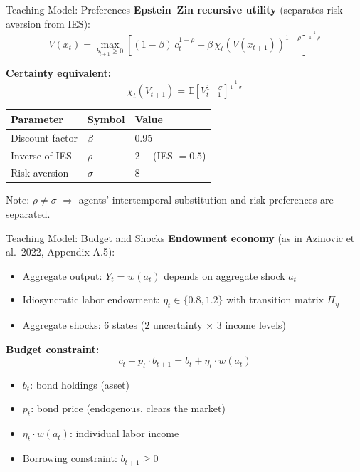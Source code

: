 \documentclass[aspectratio=169,11pt]{beamer}
\newcommand{\emphc}[1]{\textcolor{harvardcrimson}{#1}}
\newcommand{\E}[1]{\mathbb{E}\!\left[#1\right]}
\begin{document}
\begin{frame}{Teaching Model: Preferences}
\textbf{Epstein--Zin recursive utility} (separates risk aversion from IES):
\[
\boxed{V(x_t) = \max_{b_{t+1} \geq 0} \left[(1-\beta)\, c_t^{1-\rho} + \beta\, \chi_t\!\left(V(x_{t+1})\right)^{1-\rho}\right]^{\frac{1}{1-\rho}}}
\]

\vspace{0.3em}
\textbf{Certainty equivalent:}
\[
\chi_t(V_{t+1}) = \E{V_{t+1}^{1-\sigma}}^{\!\frac{1}{1-\sigma}}
\]

\vspace{0.3em}
\begin{center}
\begin{tabular}{lll}
\toprule
\textbf{Parameter} & \textbf{Symbol} & \textbf{Value} \\
\midrule
Discount factor & $\beta$ & 0.95 \\
Inverse of IES & $\rho$ & 2 ~~(IES $= 0.5$) \\
Risk aversion & $\sigma$ & 8 \\
\bottomrule
\end{tabular}
\end{center}

\vspace{0.2em}
{\small Note: $\rho \neq \sigma$ $\Rightarrow$ agents' intertemporal substitution and risk preferences are \emphc{separated}.}
\end{frame}

\begin{frame}{Teaching Model: Budget and Shocks}
\textbf{Endowment economy} (as in Azinovic et al.\ 2022, Appendix A.5):
\begin{itemize}
    \item Aggregate output: $Y_t = w(a_t)$ depends on aggregate shock $a_t$
    \item Idiosyncratic labor endowment: $\eta_t \in \{0.8, 1.2\}$ with transition matrix $\Pi_\eta$
    \item Aggregate shocks: 6 states ($2$ uncertainty $\times$ $3$ income levels)
\end{itemize}

\vspace{0.5em}
\textbf{Budget constraint:}
\[
\boxed{c_t + p_t \cdot b_{t+1} = b_t + \eta_t \cdot w(a_t)}
\]

\vspace{0.3em}
\begin{itemize}
    \item $b_t$: bond holdings (asset)
    \item $p_t$: bond price (endogenous, clears the market)
    \item $\eta_t \cdot w(a_t)$: individual labor income
    \item \emphc{Borrowing constraint}: $b_{t+1} \geq 0$
\end{itemize}
\end{frame}
\end{document}
